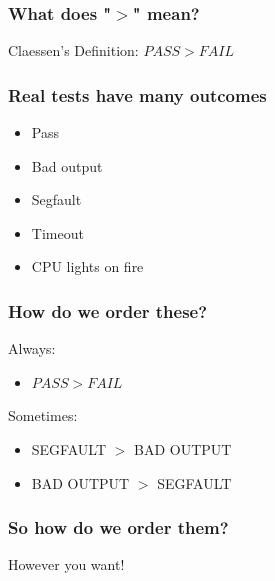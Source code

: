 \documentclass[svgnames,14pt]{beamer}
\newcommand\fail{\mathit{FAIL}}
\newcommand\pass{\mathit{PASS}}
\theoremstyle{definition}
\begin{document}
\begin{frame}
\frametitle{What does "$>$" mean?}
Claessen's Definition: $\pass>\fail$
\end{frame}

\begin{frame}
\frametitle{Real tests have many outcomes}
\begin{itemize}
\item Pass
\item Bad output
\item Segfault
\item Timeout
\item CPU lights on fire
\end{itemize}
\end{frame}

\begin{frame}
\frametitle{How do we order these?}
Always:
\begin{itemize}
\item $\pass>\fail$
\end{itemize}
Sometimes:
\begin{itemize}
\item SEGFAULT $>$ BAD OUTPUT
\item BAD OUTPUT $>$ SEGFAULT
\end{itemize}
\end{frame}

\begin{frame}
\frametitle{So how do we order them?}
However you want!
\end{frame}
\end{document}
